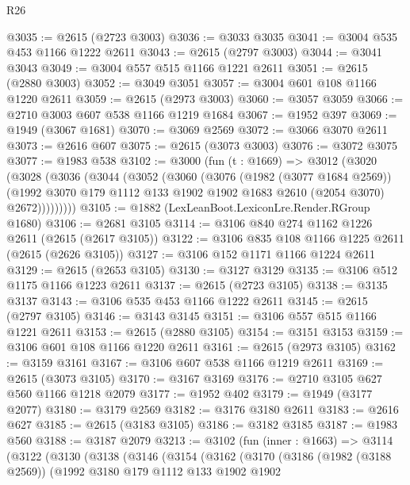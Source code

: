 \begin{lexlean}{R26}
\begin{coremodule}
@3035 := @2615 (@2723 @3003)
@3036 := @3033 @3035
@3041 := @3004 @535 @453 @1166 @1222 @2611
@3043 := @2615 (@2797 @3003)
@3044 := @3041 @3043
@3049 := @3004 @557 @515 @1166 @1221 @2611
@3051 := @2615 (@2880 @3003)
@3052 := @3049 @3051
@3057 := @3004 @601 @108 @1166 @1220 @2611
@3059 := @2615 (@2973 @3003)
@3060 := @3057 @3059
@3066 := @2710 @3003 @607 @538 @1166 @1219 @1684
@3067 := @1952 @397
@3069 := @1949 (@3067 @1681)
@3070 := @3069 @2569
@3072 := @3066 @3070 @2611
@3073 := @2616 @607
@3075 := @2615 (@3073 @3003)
@3076 := @3072 @3075
@3077 := @1983 @538
@3102 := @3000
    (fun (t : @1669) =>
    @3012
      (@3020
        (@3028
          (@3036
            (@3044
              (@3052
                (@3060
                  (@3076
                    (@1982 (@3077 @1684 @2569))
                    (@1992
                      @3070
                      @179
                      @1112
                      @133
                      @1902
                      @1902
                      @1683
                      @2610
                      (@2054 @3070)
                      @2672)))))))))
@3105 := @1882 (LexLeanBoot.LexiconLre.Render.RGroup @1680)
@3106 := @2681 @3105
@3114 := @3106 @840 @274 @1162 @1226 @2611 (@2615 (@2617 @3105))
@3122 := @3106 @835 @108 @1166 @1225 @2611 (@2615 (@2626 @3105))
@3127 := @3106 @152 @1171 @1166 @1224 @2611
@3129 := @2615 (@2653 @3105)
@3130 := @3127 @3129
@3135 := @3106 @512 @1175 @1166 @1223 @2611
@3137 := @2615 (@2723 @3105)
@3138 := @3135 @3137
@3143 := @3106 @535 @453 @1166 @1222 @2611
@3145 := @2615 (@2797 @3105)
@3146 := @3143 @3145
@3151 := @3106 @557 @515 @1166 @1221 @2611
@3153 := @2615 (@2880 @3105)
@3154 := @3151 @3153
@3159 := @3106 @601 @108 @1166 @1220 @2611
@3161 := @2615 (@2973 @3105)
@3162 := @3159 @3161
@3167 := @3106 @607 @538 @1166 @1219 @2611
@3169 := @2615 (@3073 @3105)
@3170 := @3167 @3169
@3176 := @2710 @3105 @627 @560 @1166 @1218 @2079
@3177 := @1952 @402
@3179 := @1949 (@3177 @2077)
@3180 := @3179 @2569
@3182 := @3176 @3180 @2611
@3183 := @2616 @627
@3185 := @2615 (@3183 @3105)
@3186 := @3182 @3185
@3187 := @1983 @560
@3188 := @3187 @2079
@3213 := @3102
    (fun (inner : @1663) =>
    @3114
      (@3122
        (@3130
          (@3138
            (@3146
              (@3154
                (@3162
                  (@3170
                    (@3186
                      (@1982 (@3188 @2569))
                      (@1992
                        @3180
                        @179
                        @1112
                        @133
                        @1902
                        @1902

\end{coremodule}
\end{lexlean}
